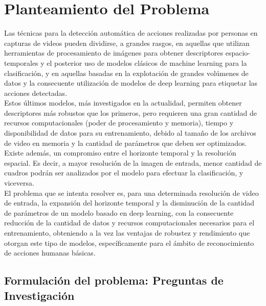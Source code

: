 \chapter{Planteamiento del Problema} \label{Problem}

Las técnicas para la detección automática de acciones realizadas por personas en capturas de videos pueden dividirse, a grandes rasgos, en aquellas que utilizan herramientas de procesamiento de imágenes para obtener descriptores espacio-temporales y el posterior uso de modelos clásicos de machine learning para la clasificación, y en aquellas basadas en la explotación de grandes volúmenes de datos y la consecuente utilización de modelos de deep learning para etiquetar las acciones detectadas. \\

Estos últimos modelos, más investigados en la actualidad, permiten obtener descriptores más robustos que los primeros, pero requieren una gran cantidad de recursos computacionales (poder de procesamiento y memoria), tiempo y disponibilidad de datos para su entrenamiento, debido al tamaño de los archivos de video en memoria y la cantidad de parámetros que deben ser optimizados. Existe además, un compromiso entre el horizonte temporal y la resolución espacial. Es decir, a mayor resolución de la imagen de entrada, menor cantidad de cuadros podrán ser analizados por el modelo para efectuar la clasificación, y viceversa. \\

El problema que se intenta resolver es, para una determinada resolución de video de entrada, la expansión del horizonte temporal y la disminución de la cantidad de parámetros de un modelo basado en deep learning, con la consecuente reducción de la cantidad de datos y recursos computacionales necesarios para el entrenamiento, obteniendo a la vez las ventajas de robustez y rendimiento que otorgan este tipo de modelos, específicamente para el ámbito de reconocimiento de acciones humanas básicas.

\section{Formulación del problema: Preguntas de Investigación}

